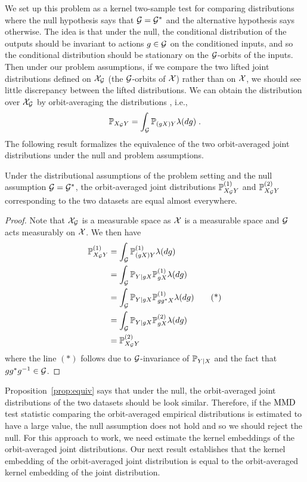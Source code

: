 We set up this problem as a kernel two-sample test for comparing distributions where the null hypothesis says that $\calG=\calG^*$ and the alternative hypothesis says otherwise. The idea is that under the null, the conditional distribution of the outputs should be invariant to actions $g\in\calG$ on the conditioned inputs, and so the conditional distribution should be stationary on the $\calG$-orbits of the inputs. Then under our problem assumptions, if we compare the two lifted joint distributions defined on $\calX_\calG$ (the $\calG$-orbits of $\calX$) rather than on $\calX$, we should see little discrepancy between the lifted distributions. We can obtain the distribution over $\calX_\calG$ by orbit-averaging the distributions \parencite{Eaton:2007}, i.e.,
\[
\P_{X_\calG Y} = \int_\calG\P_{(gX)Y}\lambda(dg) \;.
\]
The following result formalizes the equivalence of the two orbit-averaged joint distributions under the null and problem assumptions.

\begin{proposition} \label{prop:equiv}
Under the distributional assumptions of the problem setting and the null assumption $\calG=\calG^*$, the orbit-averaged joint distributions $\P_{X_\calG Y}^{(1)}$ and $\P_{X_\calG Y}^{(2)}$ corresponding to the two datasets are equal almost everywhere.
\end{proposition}
\begin{proof}
Note that $\calX_\calG$ is a measurable space as $\calX$ is a measurable space and $\calG$ acts measurably on $\calX$. We then have
\begin{align*}
\P_{X_\calG Y}^{(1)} &= \int_{\calG}\P_{(gX)Y}^{(1)}\lambda(dg) \\
&= \int_{\calG}\P_{Y|gX}\P_{gX}^{(1)}\lambda(dg) \\
&= \int_{\calG}\P_{Y|gX}\P_{gg^*X}^{(1)}\lambda(dg) \tag{*} \\
&= \int_{\calG}\P_{Y|gX}\P_{gX}^{(2)}\lambda(dg) \\
&= \P_{X_\calG Y}^{(2)}
\end{align*}
where the line $(*)$ follows due to $\calG$-invariance of $\P_{Y|X}$ and the fact that $gg^*g^{-1}\in\calG$.
\end{proof}

Proposition~\ref{prop:equiv} says that under the null, the orbit-averaged joint distributions of the two datasets should be look similar. Therefore, if the $\MMD$ test statistic comparing the orbit-averaged empirical distributions is estimated to have a large value, the null assumption does not hold and so we should reject the null. For this approach to work, we need estimate the kernel embeddings of the orbit-averaged joint distributions. Our next result establishes that the kernel embedding of the orbit-averaged joint distribution is equal to the orbit-averaged kernel embedding of the joint distribution.

